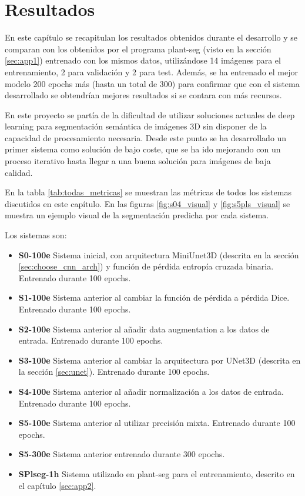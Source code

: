 \chapter{Resultados}\label{pruebas}

En este capítulo se recapitulan los resultados obtenidos durante el desarrollo y se comparan con los obtenidos por el programa plant-seg (visto en la sección \ref{sec:app1}) entrenado con los mismos datos, utilizándose 14 imágenes para el entrenamiento, 2 para validación y 2 para test. Además, se ha entrenado el mejor modelo 200 epochs más (hasta un total de 300) para confirmar que con el sistema desarrollado se obtendrían mejores resultados si se contara con más recursos.

En este proyecto se partía de la dificultad de utilizar soluciones actuales de deep learning para segmentación semántica de imágenes 3D sin disponer de la capacidad de procesamiento necesaria. Desde este punto se ha desarrollado un primer sistema como solución de bajo coste, que se ha ido mejorando con un proceso iterativo hasta llegar a una buena solución para imágenes de baja calidad.

En la tabla \ref{tab:todas_metricas} se muestran las métricas de todos los sistemas discutidos en este capítulo. En las figuras \ref{fig:s04_visual} y \ref{fig:s5pls_visual} se muestra un ejemplo visual de la segmentación  predicha por cada sistema.

Los sistemas son:
\begin{itemize}
\item \textbf{S0-100e} Sistema inicial, con arquitectura MiniUnet3D (descrita en la sección \ref{sec:choose_cnn_arch}) y función de pérdida entropía cruzada binaria. Entrenado durante 100 epochs.
\item \textbf{S1-100e} Sistema anterior al cambiar la función de pérdida a pérdida Dice. Entrenado durante 100 epochs.
\item \textbf{S2-100e} Sistema anterior al añadir data augmentation a los datos de entrada. Entrenado durante 100 epochs.
\item \textbf{S3-100e} Sistema anterior al cambiar la arquitectura por UNet3D (descrita en la sección \ref{sec:unet}). Entrenado durante 100 epochs.
\item \textbf{S4-100e} Sistema anterior al añadir normalización a los datos de entrada. Entrenado durante 100 epochs.
\item \textbf{S5-100e} Sistema anterior al utilizar precisión mixta. Entrenado durante 100 epochs.
\item \textbf{S5-300e} Sistema anterior entrenado durante 300 epochs.
\item \textbf{SPlseg-1h} Sistema utilizado en plant-seg para el entrenamiento, descrito en el capítulo \ref{sec:app2}.
\end{itemize}

